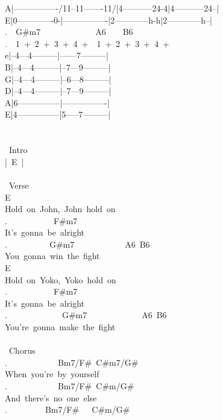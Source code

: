 {A|----------------/11--11-------11/|4-----------24-4|4-----------24--|\\
E|0-------------0-|----------------|2------------h-h|2------------h--|\\
.\ \ G\#m7\ \ \ \ \ \ \ \ \ \ \ \ \ A6\ \ \ \ B6\\
.\ \ 1\ +\ 2\ +\ 3\ +\ 4\ +\ \ 1\ +\ 2\ +\ 3\ +\ 4\ +\ \ \\
e|--4---4---------|------7---------|\\
B|--4---4---------|--7---9---------|\\
G|--4---4---------|--6---8---------|\\
D|--4---4---------|--7---9---------|\\
A|6---------------|----------------|\\
E|4---------------|5-----7---------|\\
\\
\\
\lbrack\ Intro\rbrack\\
|\ E\ |\ %
\\
\\
\lbrack\ Verse\rbrack\\
E\ \\
Hold\ on\ John,\ John\ hold\ on\\
.\ \ \ \ \ \ \ \ \ \ \ F\#m7\\
It's\ gonna\ be\ alright\\
.\ \ \ \ \ \ \ \ \ \ G\#m7\ \ \ \ \ \ \ \ \ \ \ \ A6\ B6\\
You\ gonna\ win\ the\ fight\\
E\\
Hold\ on\ Yoko,\ Yoko\ hold\ on\\
.\ \ \ \ \ \ \ \ \ \ \ F\#m7\\
It's\ gonna\ be\ alright\\
.\ \ \ \ \ \ \ \ \ \ \ \ \ G\#m7\ \ \ \ \ \ \ \ \ \ \ \ \ A6\ B6\ \\
You're\ gonna\ make\ the\ fight\\
\\
\lbrack\ Chorus\rbrack\\
.\ \ \ \ \ \ \ \ \ \ \ \ Bm7/F\#\ C\#m7/G\#\\
When\ you're\ by\ yourself\\
.\ \ \ \ \ \ \ \ \ \ \ \ Bm7/F\#\ C\#m/G\#\\
And\ there's\ no\ one\ else\\
.\ \ \ \ \ \ \ \ \ Bm7/F\#\ \ \ C\#m/G\#\\
}
